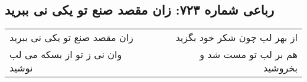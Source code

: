 \begin{center}
\section*{رباعی شماره ۷۲۳: زان مقصد صنع تو یکی نی ببرید}
\label{sec:0723}
\begin{longtable}{l p{0.5cm} r}
زان مقصد صنع تو یکی نی ببرید
&&
از بهر لب چون شکر خود بگزید
\\
وان نی ز تو از بسکه می لب نوشید
&&
هم بر لب تو مست شد و بخروشید
\\
\end{longtable}
\end{center}
